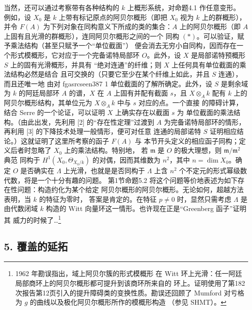 \documentclass[12pt,twoside,openany]{book}
\numberwithin{equation}{section}
\newcommand{\fgaunitid}{unbound}
\newcommand{\src}[1]{%
  \phantomsection
  \hypertarget{src:\fgaunitid:#1}{}%
  \hypertarget{fga.\fgaunitid.p#1}{}%
  \ifcsname fgasrcseen#1\endcsname\else
    \expandafter\gdef\csname fgasrcseen#1\endcsname{1}%
    \hypertarget{src:#1}{}%
  \fi
  \marginpar{\raggedleft\footnotesize\sffamily #1}%
}
\newcommand{\fquote}[1]{“#1”}
\theoremstyle{plain}
\theoremstyle{definition}
\theoremstyle{remark}
\begin{document}
当然，还可以通过考察带有各种结构的 $k$ 上概形系统，对命题4.1 作任意变形。
例如，设 $X_0$ 是 $k$ 上带有标记原点的阿贝尔概形（即把 $X_0$ 视为 $k$
上的群概形），并令 $F(A)$ 为下列对象在同构意义下所成的类的集合：$A$
上的阿贝尔概形（即 $A$ 上固有且光滑的群概形），连同阿贝尔概形之间的一个
同构 $(*)$。可以验证，赋予乘法结构（甚至只赋予一个\fquote{单位截面}）
便会消去无穷小自同构，因而存在一个形式模概形，它对应于一个完备诺特局部环
$O$。此外，设 $X$ 是局部诺特预概形 $S$ 上的固有光滑概形，并具有
\fquote{绝对连通}的纤维；则 $X$ 上任何具有单位截面的乘法结构必然是结合
且可交换的（只要它至少在某个纤维上如此，并且 $S$ 连通），而且还唯一地
由对
\src{387}单位截面的了解所确定。此外，设 $S$ 是剩余域为 $k$ 的阿廷局部环
$A$ 的谱，$X$ 在 $A$ 上固有并配有截面 $s$，且 $X\otimes_Ak$ 配有 $k$
上的阿贝尔概形结构，其单位元为 $X\otimes_Ak$ 中与 $s$ 对应的点。一个直接
的障碍计算，结合 Serre 的一个论证，可以证明 $X$ 上确实存在以截面 $s$ 为
单位截面的乘法结构。（由此出发，先利用 [2] 的\fquote{存在性定理}过渡到
$A$ 为完备诺特局部环的情形，再利用 [3] 的下降技术处理一般情形，便可对任意
连通的局部诺特 $S$ 证明相应结论。）这就证明了这里所考察的函子 $F(A)$ 与
本节开头定义的相应函子同构；定义后者时忽略了 $X_0$ 上的乘法结构。特别地，
若 $\mathfrak m$ 是 $O$ 的极大理想，则 $\mathfrak m/\mathfrak m^2$ 典范
同构于 $H^1(X_0,\Theta_{X_0/k})$ 的对偶，因而其维数为 $n^2$，其中
$n=\dim X_0$。确定 $O$ 是否确实在 $\Lambda$ 上光滑，也就是是否同构于
$\Lambda$ 上含 $n^2$ 个不定元的形式幂级数代数，将是一个十分有趣的问题。
第1节命题5.2 将这个问题等价地表述为如下存在性问题：构造约化为某个给定
阿贝尔概形的阿贝尔概形。无论如何，超越方法表明，当 $k$ 的特征为零时，
答案是肯定的。在特征 $p\ne0$ 时，显然只需考虑 $\Lambda$ 是由代数闭域 $k$
构造的 Witt 向量环这一情形。也许现在正是\fquote{Greenberg 函子}证明其
威力的时候了\ldots\footnote{1962 年勘误指出，域上阿贝尔簇的形式模概形
在 Witt 环上光滑：任一阿廷局部商环上的阿贝尔概形都可提升到该商环所来自的
环上。证明使用了第182次报告第12页引入的提升障碍类的变换性质。勘误还回顾了
Mumford 对亏格为 $g$ 的曲线以及极化阿贝尔概形所作的模概形构造
（参见 SHMT）。}

\subsection*{5. 覆盖的延拓}
\end{document}
